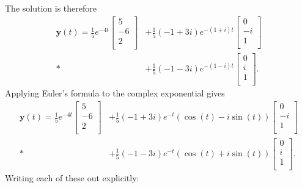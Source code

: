 The solution is therefore
\begin{align}
  \mathbf{y}(t) = \frac{1}{5} e^{-4t} \left[ \begin{array}{c} 5 \\ -6 \\ 2 \\ \end{array} \right]
                &+ \frac{1}{5} ( -1 + 3i ) e^{-(1+i)t} \left[ \begin{array}{c} 0 \\ -i \\ 1 \\ \end{array} \right] \nonumber \\*
                &+ \frac{1}{5} ( -1 - 3i ) e^{-(1-i)t} \left[ \begin{array}{c} 0 \\  i \\ 1 \\ \end{array} \right] .
\end{align}
Applying Euler's formula to the complex exponential gives
\begin{align}
  \mathbf{y}(t) = \frac{1}{5} e^{-4t} \left[ \begin{array}{c} 5 \\ -6 \\ 2 \\ \end{array} \right]
                &+ \frac{1}{5} ( -1 + 3i ) e^{-t} ( \cos(t) - i \sin(t) ) \left[ \begin{array}{c} 0 \\ -i \\ 1 \\ \end{array} \right] \nonumber \\*
                &+ \frac{1}{5} ( -1 - 3i ) e^{-t} ( \cos(t) + i \sin(t) ) \left[ \begin{array}{c} 0 \\  i \\ 1 \\ \end{array} \right] .
\end{align}
Writing each of these out explicitly:
